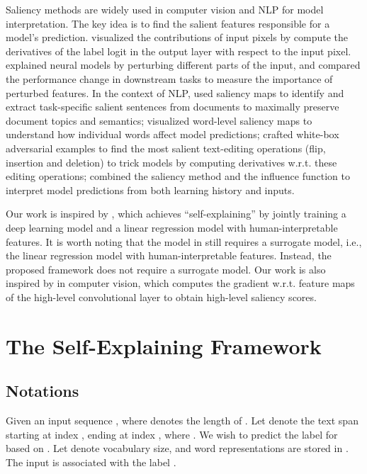 \documentclass[11pt,a4paper]{article}
\begin{document}
Saliency methods are widely used in  computer vision \citep{simonyan2013deep,zeiler2014visualizing,springenberg2014striving,adler2018auditing,datta2016algorithmic,srinivas2019full} and NLP \cite{denil2015extraction,li2015visualizing,li2016understanding,arras2016explaining,ebrahimi2017hotflip,feng2018pathologies,meng2020pair} for model interpretation. 
The key idea is to 
 find the  salient features responsible for a model's prediction.
 \citet{simonyan2013deep,srinivas2019full} visualized the contributions of input pixels by compute the derivatives of the label logit in the output layer with respect to the input pixel. 
 \citet{adler2018auditing,datta2016algorithmic} explained neural models by perturbing different  parts of the input, and compared the performance change in downstream tasks to measure the importance of perturbed features.
In the context of NLP,  \citet{denil2015extraction} used saliency maps to identify and extract task-specific salient sentences from documents to maximally preserve document topics and semantics; 
\citet{li2015visualizing} visualized word-level saliency maps to understand how individual words affect model predictions; \citet{ebrahimi2017hotflip} crafted white-box adversarial examples 
to find the most salient text-editing operations (flip, insertion and deletion) to trick models
by computing derivatives w.r.t. these editing operations; \citet{meng2020pair} combined the saliency method and the influence function \citep{koh2017understanding} to interpret model predictions from both learning history and inputs. 

 
  
Our work is inspired by , which achieves  ``self-explaining'' by jointly training a deep learning model and a linear regression model with human-interpretable features.
It is worth noting that the model in  still requires a surrogate model, i.e., the  linear regression model with human-interpretable features. 
Instead, the proposed framework does not require a surrogate model. 
Our work is also inspired by  in computer vision, 
which 
computes the gradient  w.r.t.  feature maps of the high-level convolutional
layer to obtain high-level saliency scores. 

\section{The Self-Explaining Framework}
\subsection{Notations}
Given an input sequence , where  denotes the length of . 
Let  denote the text span starting at index , ending at index , where
. 
We wish to predict the label  for  based on .
Let  denote vocabulary size, and word representations are stored in .
The input  is associated with the label . 
\end{document}
